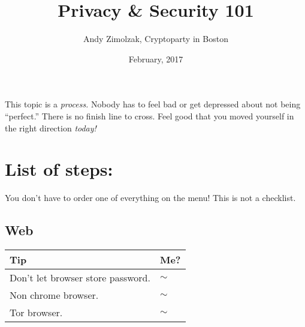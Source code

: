 \documentclass{tufte-handout}
\title{Privacy \& Security 101}
\author{Andy Zimolzak, Cryptoparty in Boston}
\date{February, 2017}
\begin{document}
\maketitle

This topic is a \emph{process.} Nobody has to feel bad or get depressed
about not being ``perfect.'' There is no finish line to cross. Feel good
that you moved yourself in the right direction \emph{today!}


\section{List of steps:}

You don't have to order one of everything on the menu! This is not a
checklist.

\subsection{Web}

\begin{tabular}{p{5in}l}
\hline
\textbf{Tip} & \textbf{Me?} \\
\hline

Don't let browser store password. & $\sim$ \\

Non chrome browser. & $\sim$ \\

Tor browser. & $\sim$ \\

\hline
\end{tabular}
\end{document}
